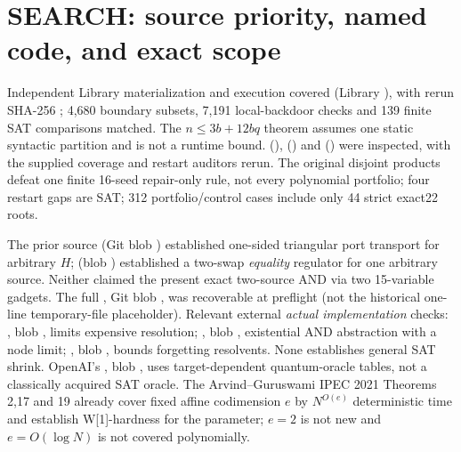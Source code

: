 \documentclass[10pt]{article}
\begin{document}
\section{SEARCH: source priority, named code, and exact scope}
Independent Library materialization and execution covered  (Library ), with rerun  SHA-256 ; 4,680 boundary subsets, 7,191 local-backdoor checks and 139 finite SAT comparisons matched. The $n\le3b+12bq$ theorem assumes one static syntactic partition and is not a runtime bound.  (),  () and  () were inspected, with the supplied coverage and restart auditors rerun. The original disjoint products defeat one finite 16-seed repair-only rule, not every polynomial portfolio; four restart gaps are SAT; 312 portfolio/control cases include only 44 strict exact22 roots.

The prior source  (Git blob ) established one-sided triangular port transport for arbitrary $H$;  (blob ) established a two-swap \emph{equality} regulator for one arbitrary source. Neither claimed the present exact two-source AND via two 15-variable gadgets. The full , Git blob , was recoverable at preflight (not the historical one-line temporary-file placeholder). Relevant external \emph{actual implementation} checks: , blob , limits expensive resolution; , blob , existential AND abstraction with a node limit; , blob , bounds forgetting resolvents. None establishes general SAT shrink. OpenAI's , blob , uses target-dependent quantum-oracle tables, not a classically acquired SAT oracle. The Arvind--Guruswami IPEC 2021 Theorems 2,17 and 19 already cover fixed affine codimension $e$ by $N^{O(e)}$ deterministic time and establish W[1]-hardness for the parameter; $e=2$ is not new and $e=O(\log N)$ is not covered polynomially.
\end{document}
